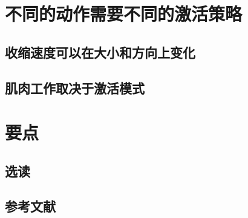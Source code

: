 \section{不同的动作需要不同的激活策略}
\subsection{收缩速度可以在大小和方向上变化}
\subsection{肌肉工作取决于激活模式}

\section{要点}
\subsection{选读}
\subsection{参考文献}